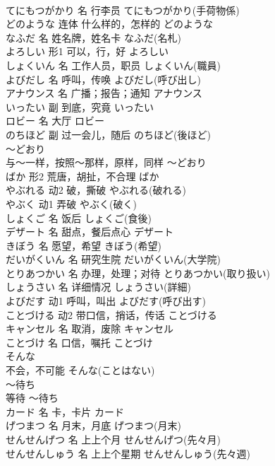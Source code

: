 \documentclass[8pt]{extreport}
\begin{document}
\begin{CJK}{UTF8}{min}
\\	てにもつがかり	名	行李员	てにもつがかり(手荷物係)	
\\	どのような	连体	什么样的，怎样的	どのような	
\\	なふだ	名	姓名牌，姓名卡	なふだ(名札)	
\\	よろしい	形1	可以，行，好	よろしい	
\\	しょくいん	名	工作人员，职员	しょくいん(職員)	
\\	よびだし	名	呼叫，传唤	よびだし(呼び出し)	
\\	アナウンス	名	广播；报告；通知	アナウンス	
\\	いったい	副	到底，究竟	いったい	
\\	ロビー	名	大厅	ロビー	
\\	のちほど	副	过一会儿，随后	のちほど(後ほど)	
\\	～どおり	
\\	与～一样，按照～那样，原样，同样	～どおり	
\\	ばか	形2	荒唐，胡扯，不合理	ばか	
\\	やぶれる	动2	破，撕破	やぶれる(破れる)	
\\	やぶく	动1	弄破	やぶく(破く)	
\\	しょくご	名	饭后	しょくご(食後)	
\\	デザート	名	甜点，餐后点心	デザート	
\\	きぼう	名	愿望，希望	きぼう(希望)	
\\	だいがくいん	名	研究生院	だいがくいん(大学院)	
\\	とりあつかい	名	办理，处理；对待	とりあつかい(取り扱い)	
\\	しょうさい	名	详细情况	しょうさい(詳細)	
\\	よびだす	动1	呼叫，叫出	よびだす(呼び出す)	
\\	ことづける	动2	带口信，捎话，传话	ことづける	
\\	キャンセル	名	取消，废除	キャンセル	
\\	ことづけ	名	口信，嘱托	ことづけ	
\\	そんな	
\\	不会，不可能	そんな(ことはない)	
\\	～待ち	
\\	等待	～待ち	
\\	カード	名	卡，卡片	カード	
\\	げつまつ	名	月末，月底	げつまつ(月末)	
\\	せんせんげつ	名	上上个月	せんせんげつ(先々月)	
\\	せんせんしゅう	名	上上个星期	せんせんしゅう(先々週)	

\end{CJK}
\end{document}
